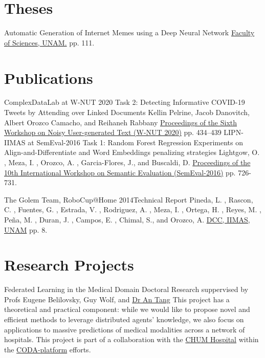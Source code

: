 \documentclass[8pt,a4paper,sans]{moderncv} %
\begin{document}
\section{Theses}

        {Automatic Generation of Internet Memes using a Deep Neural Network}
        {}{}{}
        {\href{http://132.248.9.195/ptd2018/febrero/0770173/}{Faculty of Sciences, UNAM.} pp. 111.}

\newpage

\section{Publications}

        {ComplexDataLab at W-NUT 2020 Task 2: Detecting Informative COVID-19 Tweets by Attending over Linked Documents}
        {}{}{}
        {Kellin Pelrine, Jacob Danovitch, Albert Orozco Camacho, and Reihaneh Rabbany
         \href{https://www.aclweb.org/anthology/2020.wnut-1.63}{Proceedings of the Sixth Workshop on Noisy User-generated Text (W-NUT 2020)} pp. 434–439}
        {LIPN-IIMAS at SemEval-2016 Task 1: Random Forest Regression Experiments on Align-and-Differentiate and Word Embeddings penalizing strategies}
        {}{}{}
        {Lightgow, O. , Meza, I. , Orozco, A. , Garcia-Flores, J., and Buscaldi, D.
         \href{https://www.aclweb.org/anthology/S/S16/S16-1112.pdf}{Proceedings of the 10th International Workshop on Semantic Evaluation (SemEval-2016)} pp. 726-731.}

        {The Golem Team, RoboCup@Home 2014}{Technical Report}
        {}{}
        {Pineda, L. , Rascon, C. , Fuentes, G. , Estrada, V. , Rodriguez, A. , Meza, I. , Ortega, H. ,
         Reyes, M. , Peña, M. , Duran, J. , Campos, E. , Chimal, S., and Orozco, A.
         \href{http://golem.iimas.unam.mx/pubs/tdp_Golem-II+_2014.pdf}{DCC, IIMAS, UNAM} pp. 8.}

\section{Research Projects}


        {Federated Learning in the Medical Domain}
        {Doctoral Research}
        {suppervised by Profs Eugene Belilovsky, Guy Wolf, 
        and \href{https://www.chumontreal.qc.ca/en/crchum/chercheurs/an-tang}{Dr An Tang}}
        {This project has a theoretical and practical component: while we would like to
        propose novel and efficient methods to leverage distributed agents' knowledge, we
        also focus on applications to massive predictions of medical modalities across a network of
        hospitals.}
        {This project is part of a collaboration with the 
        \href{https://www.chumontreal.qc.ca/en/crchum}{CHUM Hospital}
        within the \href{https://www.coda-platform.com}{CODA-platform} efforts.}
\end{document}
